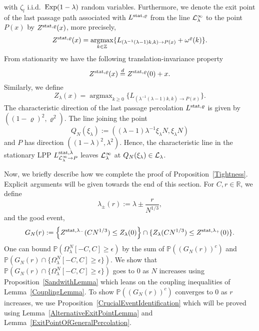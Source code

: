 \documentclass[12pt,a4paper]{article}
\numberwithin{equation}{section}
\newcommand{\Pb}{\mathbb{P}}
\newcommand{\R}{\mathbb{R}}
\newcommand{\Z}{\mathbb{Z}}
\DeclareMathOperator\argmax{argmax}
\begin{document}
with $\zeta_l$ i.i.d.\ ${\rm Exp}(1-\lambda)$ random variables. Furthermore, we denote the exit point of the last passage path associated with $L^{{\rm stat},\varrho}$ from the line ${\cal L}^\infty_\lambda$ to the point $P(x)$ by $Z^{{\rm stat},\varrho}(x)$,
more precisely,
\begin{equation}
Z^{{\rm stat},\varrho}(x)=\argmax_{k\in\Z}\{L_{\left(\lambda^{-1}(\lambda-1)k,k\right)\to P(x)}+\omega^{\varrho}(k)\}.
\end{equation}
From stationarity we have the following translation-invariance property
\begin{equation}\label{eqTranslInv}
Z^{{\rm stat},\varrho}(x) \stackrel{d}{=} Z^{{\rm stat},\varrho}(0)+x.
\end{equation}
Similarly, we define
\begin{equation}\label{eq5.37}
Z_\lambda(x)=\argmax_{k\geq 0}\{L_{\left(\lambda^{-1}(\lambda-1)k,k\right)\to P(x)}\}.
\end{equation}
The characteristic direction of the last passage percolation $L^{{\rm stat},\varrho}$ is given by $\left((1-\varrho)^2, \varrho^2\right)$. The line joining the point
\begin{equation}
Q_{N}(\xi_{\lambda}):=((\lambda-1)\lambda^{-1} \xi_{\lambda}N, \xi_{\lambda}N)
\end{equation} and $P$ has direction $((1-\lambda)^2, \lambda^2)$. Hence, the characteristic line in the stationary LPP $L^{{\rm stat},\lambda}_{{\cal L}^\infty_\lambda\to P}$ leaves ${\cal L}^\infty_\lambda$ at $Q_{N}(\xi_{\lambda})\in {\cal L}_\lambda$.

Now, we briefly describe how we complete the proof of Proposition~\ref{Tightness}. Explicit arguments will be given towards the end of this section. For $C,r\in \R$, we define
\begin{equation}
\lambda_{\pm}(r) := \lambda \pm \frac{r}{N^{1/3}},
\end{equation}
and the good event,
\begin{equation}\label{eq:GoodEvent}
G_{N}(r):= \left\{Z^{{\rm stat},\lambda_-}(CN^{1/3})\leq Z_\lambda(0)\right\} \cap \{Z_\lambda(CN^{1/3})\leq Z^{{\rm stat},\lambda_+}(0)\}.
\end{equation}
One can bound $\Pb(\Omega^N_{\lambda}[-C,C]\geq \epsilon)$ by the sum of $\Pb((G_N(r))^c)$ and $\Pb(G_N(r)\cap \{\Omega^{N}_{\lambda}[-C,C]\geq \epsilon\})$. We show that $\Pb(G_N(r)\cap \{\Omega^{N}_{\lambda}[-C,C]\geq \epsilon\})$ goes to $0$ as $N$ increases using Proposition~\ref{SandwithLemma} which leans on the coupling inequalities of Lemma~\ref{CouplingLemma}. To show $\Pb((G_N(r))^c)$ converges to $0$ as $r$ increases, we use Proposition~\ref{CrucialEventIdentification} which will be proved using Lemma~\ref{AlternativeExitPointLemma} and Lemma~\ref{ExitPointOfGeneralPercolation}.
\end{document}
